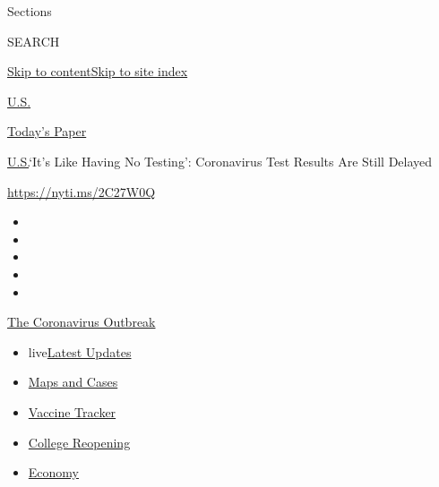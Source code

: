 Sections

SEARCH

\protect\hyperlink{site-content}{Skip to
content}\protect\hyperlink{site-index}{Skip to site index}

\href{https://www.nytimes3xbfgragh.onion/section/us}{U.S.}

\href{https://myaccount.nytimes3xbfgragh.onion/auth/login?response_type=cookie\&client_id=vi}{}

\href{https://www.nytimes3xbfgragh.onion/section/todayspaper}{Today's
Paper}

\href{/section/us}{U.S.}\textbar{}`It's Like Having No Testing':
Coronavirus Test Results Are Still Delayed

\url{https://nyti.ms/2C27W0Q}

\begin{itemize}
\item
\item
\item
\item
\item
\end{itemize}

\href{https://www.nytimes3xbfgragh.onion/news-event/coronavirus?action=click\&pgtype=Article\&state=default\&region=TOP_BANNER\&context=storylines_menu}{The
Coronavirus Outbreak}

\begin{itemize}
\tightlist
\item
  live\href{https://www.nytimes3xbfgragh.onion/2020/08/04/world/coronavirus-cases.html?action=click\&pgtype=Article\&state=default\&region=TOP_BANNER\&context=storylines_menu}{Latest
  Updates}
\item
  \href{https://www.nytimes3xbfgragh.onion/interactive/2020/us/coronavirus-us-cases.html?action=click\&pgtype=Article\&state=default\&region=TOP_BANNER\&context=storylines_menu}{Maps
  and Cases}
\item
  \href{https://www.nytimes3xbfgragh.onion/interactive/2020/science/coronavirus-vaccine-tracker.html?action=click\&pgtype=Article\&state=default\&region=TOP_BANNER\&context=storylines_menu}{Vaccine
  Tracker}
\item
  \href{https://www.nytimes3xbfgragh.onion/2020/08/02/us/covid-college-reopening.html?action=click\&pgtype=Article\&state=default\&region=TOP_BANNER\&context=storylines_menu}{College
  Reopening}
\item
  \href{https://www.nytimes3xbfgragh.onion/live/2020/08/04/business/stock-market-today-coronavirus?action=click\&pgtype=Article\&state=default\&region=TOP_BANNER\&context=storylines_menu}{Economy}
\end{itemize}

